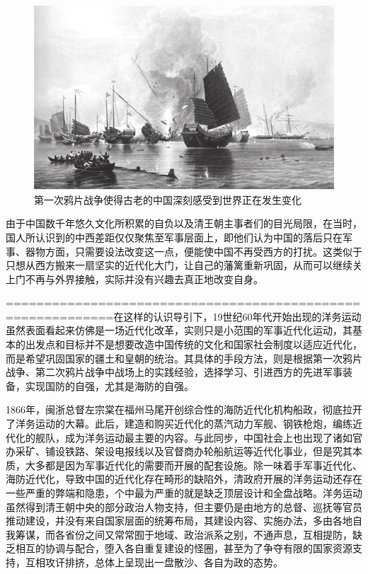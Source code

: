 \documentclass[12pt,UTF8]{ctexbook}
\begin{document}
\begin{figure}[htbp]
	\centering
	\includegraphics[width=0.7\linewidth]{1}
	\caption{第一次鸦片战争使得古老的中国深刻感受到世界正在发生变化}
	\label{fig:1}
\end{figure}

由于中国数千年悠久文化所积累的自负以及清王朝主事者们的目光局限，在当时，国人所认识到的中西差距仅仅聚焦至军事层面上，即他们认为中国的落后只在军事、器物方面，只需要设法改变这一点，便能使中国不再受西方的打扰。这类似于只想从西方搬来一扇坚实的近代化大门，让自己的藩篱重新巩固，从而可以继续关上门不再与外界接触，实际并没有兴趣去真正地改变自身。

============================================================在这样的认识导引下，19世纪60年代开始出现的洋务运动虽然表面看起来仿佛是一场近代化改革，实则只是小范围的军事近代化运动，其基本的出发点和目标并不是想要改造中国传统的文化和国家社会制度以适应近代化，而是希望巩固国家的疆土和皇朝的统治。其具体的手段方法，则是根据第一次鸦片战争、第二次鸦片战争中战场上的实践经验，选择学习、引进西方的先进军事装备，实现国防的自强，尤其是海防的自强。

1866年，闽浙总督左宗棠在福州马尾开创综合性的海防近代化机构船政，彻底拉开了洋务运动的大幕。此后，建造和购买近代化的蒸汽动力军舰、钢铁枪炮，编练近代化的舰队，成为洋务运动最主要的内容。与此同步，中国社会上也出现了诸如官办采矿、铺设铁路、架设电报线以及官督商办轮船航运等近代化事业，但是究其本质，大多都是因为军事近代化的需要而开展的配套设施。除一味着手军事近代化、海防近代化，导致中国的近代化存在畸形的缺陷外，清政府开展的洋务运动还存在一些严重的弊端和隐患，个中最为严重的就是缺乏顶层设计和全盘战略。洋务运动虽然得到清王朝中央的部分政治人物支持，但主要仍是由地方的总督、巡抚等官员推动建设，并没有来自国家层面的统筹布局，其建设内容、实施办法，多由各地自我筹谋，而各省份之间又常常囿于地域、政治派系之别，不通声息，互相提防，缺乏相互的协调与配合，堕入各自重复建设的怪圈，甚至为了争夺有限的国家资源支持，互相攻讦排挤，总体上呈现出一盘散沙、各自为政的态势。
\end{document}

